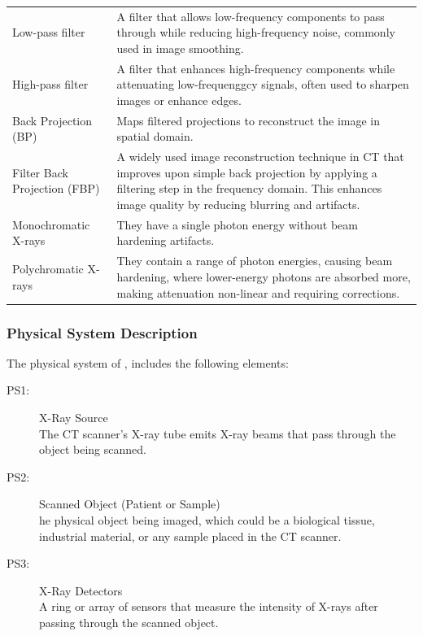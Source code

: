 \documentclass[12pt]{article}
\begin{document}
\begin{tabular}{p{4cm} p{11cm}}
  Low-pass filter & A filter that allows low-frequency components to pass through while reducing high-frequency noise, commonly used in image smoothing.\\

  High-pass filter & A filter that enhances high-frequency components while attenuating low-frequenggcy signals, often used to sharpen images or enhance edges.\\

  Back Projection (BP) & Maps filtered projections to reconstruct the image in spatial domain.\\

  Filter Back Projection (FBP) & A widely used image reconstruction technique in CT that improves upon simple back projection by applying a filtering step in the frequency domain. This enhances image quality by reducing blurring and artifacts.\\

  Monochromatic X-rays & They have a single photon energy without beam hardening artifacts.\\

  Polychromatic X-rays & They contain a range of photon energies, causing beam hardening, where lower-energy photons are absorbed more, making attenuation non-linear and requiring corrections.\\
  \bottomrule
\end{tabular}

\subsubsection{Physical System Description} \label{sec_phySystDescrip}
The physical system of \progname{}, includes the following elements:

\begin{description}
\item[PS1:] X-Ray Source \hfill \\
  The CT scanner's X-ray tube emits X-ray beams that pass through the object being scanned.

\item[PS2:] Scanned Object (Patient or Sample) \hfill \\
  he physical object being imaged, which could be a biological tissue, industrial material, or any sample placed in the CT scanner.

\item[PS3:] X-Ray Detectors \hfill \\
  A ring or array of sensors that measure the intensity of X-rays after passing through the scanned object.

%
\end{description}
\end{document}
